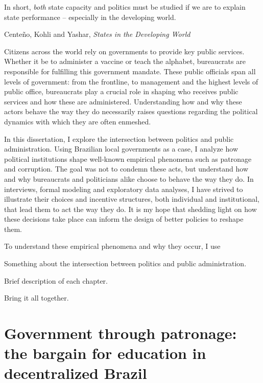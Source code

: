\documentclass[12pt]{report}
\theoremstyle{definition}
\begin{document}
\epigraph{\singlespacing In short, \emph{both} state capacity and politics must be studied if we are to explain state performance -- especially in the developing world.}{\singlespacing Cente\~{n}o, Kohli and Yashar, \emph{States in the Developing World}}

Citizens across the world rely on governments to provide key public services. Whether it be to administer a vaccine or teach the alphabet, bureaucrats are responsible for fulfilling this government mandate. These public officials span all levels of government: from the frontline, to management and the highest levels of public office, bureaucrats play a crucial role in shaping who receives public services and how these are administered. Understanding how and why these actors behave the way they do necessarily raises questions regarding the political dynamics with which they are often enmeshed.

In this dissertation, I explore the intersection between politics and public administration. Using Brazilian local governments as a case, I analyze how political institutions shape well-known empirical phenomena such as patronage and corruption. The goal was not to condemn these acts, but understand how and why bureaucrats and politicians alike choose to behave the way they do. In interviews, formal modeling and exploratory data analyses, I have strived to illustrate their choices and incentive structures, both individual and institutional, that lead them to act the way they do. It is my hope that shedding light on how these decisions take place can inform the design of better policies to reshape them.

To understand these empirical phenomena and why they occur, I use 

Something about the intersection between politics and public administration.

Brief description of each chapter.

Bring it all together.

\tableofcontents

\chapter{Government through patronage: the bargain for education in decentralized Brazil \protect\footnotemark}

\end{document}
